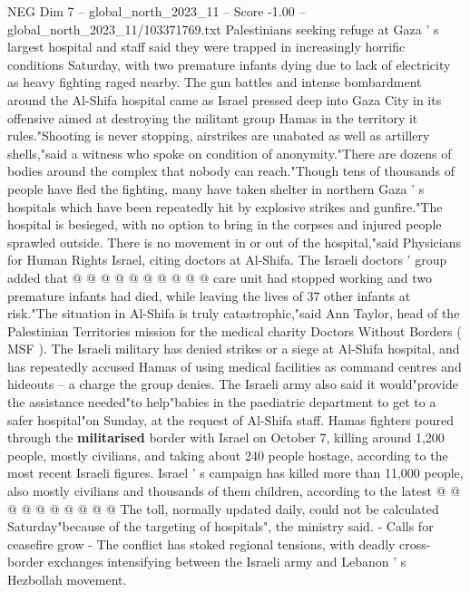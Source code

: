 \begin{textsample}{NEG Dim 7 – global\_north\_2023\_11 – Score -1.00 – global\_north\_2023\_11/103371769.txt}  \label{ex:f7_neg_329}
Palestinians seeking refuge at Gaza ' s largest hospital and staff said they were trapped in increasingly horrific conditions Saturday, with two premature infants dying due to lack of electricity as heavy fighting raged nearby.
The gun battles and intense bombardment around the Al-Shifa hospital came as Israel pressed deep into Gaza City in its offensive aimed at destroying the militant group Hamas in the territory it rules."Shooting is never stopping, airstrikes are unabated as well as artillery shells,"said a witness who spoke on condition of anonymity."There are dozens of bodies around the complex that nobody can reach."Though tens of thousands of people have fled the fighting, many have taken shelter in northern Gaza ' s hospitals which have been repeatedly hit by explosive strikes and gunfire."The hospital is besieged, with no option to bring in the corpses and injured people sprawled outside.
There is no movement in or out of the hospital,"said Physicians for Human Rights Israel, citing doctors at Al-Shifa.
The Israeli doctors ' group added that @ @ @ @ @ @ @ @ @ @ care unit had stopped working and two premature infants had died, while leaving the lives of 37 other infants at risk."The situation in Al-Shifa is truly catastrophic,"said Ann Taylor, head of the Palestinian Territories mission for the medical charity Doctors Without Borders ( MSF ).
The Israeli military has denied strikes or a siege at Al-Shifa hospital, and has repeatedly accused Hamas of using medical facilities as command centres and hideouts -- a charge the group denies.
The Israeli army also said it would"provide the assistance needed"to help"babies in the paediatric department to get to a safer hospital"on Sunday, at the request of Al-Shifa staff.
Hamas fighters poured through the \textbf{militarised} border with Israel on October 7, killing around 1,200 people, mostly civilians, and taking about 240 people hostage, according to the most recent Israeli figures.
Israel ' s campaign has killed more than 11,000 people, also mostly civilians and thousands of them children, according to the latest @ @ @ @ @ @ @ @ @ @ The toll, normally updated daily, could not be calculated Saturday"because of the targeting of hospitals", the ministry said. - Calls for ceasefire grow - The conflict has stoked regional tensions, with deadly cross-border exchanges intensifying between the Israeli army and Lebanon ' s Hezbollah movement.

\end{textsample}
